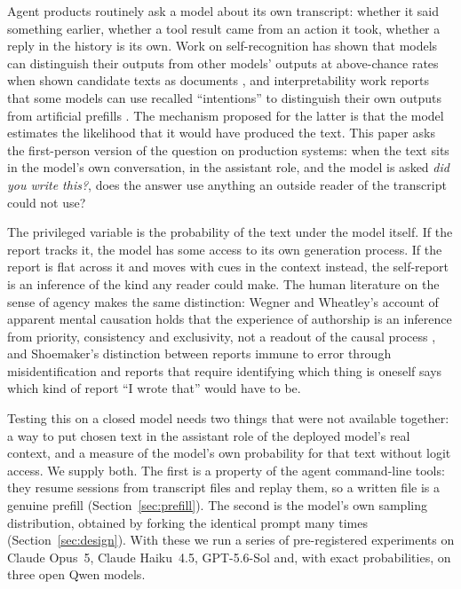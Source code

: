 \documentclass[twocolumn,10pt]{article}
\newcommand{\opus}{Claude Opus~5}
\newcommand{\haiku}{Claude Haiku~4.5}
\newcommand{\gpt}{GPT-5.6-Sol}
\begin{document}
Agent products routinely ask a model about its own transcript: whether it said something earlier, whether a tool result came from an action it took, whether a reply in the history is its own. Work on self-recognition has shown that models can distinguish their outputs from other models' outputs at above-chance rates when shown candidate texts as documents \citep{panickssery2024llm,stamand2026selfgenerated}, and interpretability work reports that some models can use recalled ``intentions'' to distinguish their own outputs from artificial prefills \citep{lindsey2026emergent}. The mechanism proposed for the latter is that the model estimates the likelihood that it would have produced the text. This paper asks the first-person version of the question on production systems: when the text sits in the model's own conversation, in the assistant role, and the model is asked \emph{did you write this?}, does the answer use anything an outside reader of the transcript could not use?

The privileged variable is the probability of the text under the model itself. If the report tracks it, the model has some access to its own generation process. If the report is flat across it and moves with cues in the context instead, the self-report is an inference of the kind any reader could make. The human literature on the sense of agency makes the same distinction: Wegner and Wheatley's account of apparent mental causation holds that the experience of authorship is an inference from priority, consistency and exclusivity, not a readout of the causal process \citep{wegner1999apparent}, and Shoemaker's distinction between reports immune to error through misidentification and reports that require identifying which thing is oneself \citep{shoemaker1968selfreference} says which kind of report ``I wrote that'' would have to be.

Testing this on a closed model needs two things that were not available together: a way to put chosen text in the assistant role of the deployed model's real context, and a measure of the model's own probability for that text without logit access. We supply both. The first is a property of the agent command-line tools: they resume sessions from transcript files and replay them, so a written file is a genuine prefill (Section~\ref{sec:prefill}). The second is the model's own sampling distribution, obtained by forking the identical prompt many times (Section~\ref{sec:design}). With these we run a series of pre-registered experiments on \opus{}, \haiku{}, \gpt{} and, with exact probabilities, on three open Qwen models.
\end{document}
